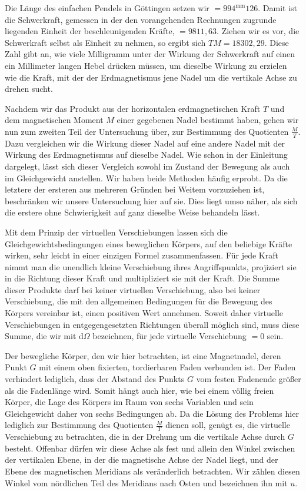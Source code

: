 Die Länge des einfachen Pendels in Göttingen setzen wir $=994^{\mathrm{mm}}126$. Damit ist die Schwerkraft, gemessen in der den vorangehenden Rechnungen zugrunde liegenden Einheit der beschleunigenden Kräfte, $=9811{,}63$. Ziehen wir es vor, die Schwerkraft selbst als Einheit zu nehmen, so ergibt sich $TM=18302{,}29$. Diese Zahl gibt an, wie viele Milligramm unter der Wirkung der Schwerkraft auf einen ein Millimeter langen Hebel drücken müssen, um dieselbe Wirkung zu erzielen wie die Kraft, mit der der Erdmagnetismus jene Nadel um die vertikale Achse zu drehen sucht.

Nachdem wir das Produkt aus der horizontalen erdmagnetischen Kraft $T$ und dem magnetischen Moment $M$ einer gegebenen Nadel bestimmt haben, gehen wir nun zum zweiten Teil der Untersuchung über, zur Bestimmung des Quotienten $\frac MT$. Dazu vergleichen wir die Wirkung dieser Nadel auf eine andere Nadel mit der Wirkung des Erdmagnetismus auf dieselbe Nadel. Wie schon in der Einleitung dargelegt, lässt sich dieser Vergleich sowohl im Zustand der Bewegung als auch im Gleichgewicht anstellen. Wir haben beide Methoden häufig erprobt. Da die letztere der ersteren aus mehreren Gründen bei Weitem vorzuziehen ist, beschränken wir unsere Untersuchung hier auf sie. Dies liegt umso näher, als sich die erstere ohne Schwierigkeit auf ganz dieselbe Weise behandeln lässt.

Mit dem Prinzip der virtuellen Verschiebungen lassen sich die Gleichgewichtsbedingungen eines beweglichen Körpers, auf den beliebige Kräfte wirken, sehr leicht in einer einzigen Formel zusammenfassen. Für jede Kraft nimmt man die unendlich kleine Verschiebung ihres Angriffspunkts, projiziert sie in die Richtung dieser Kraft und multipliziert sie mit der Kraft. Die Summe dieser Produkte darf bei keiner virtuellen Verschiebung, also bei keiner Verschiebung, die mit den allgemeinen Bedingungen für die Bewegung des Körpers vereinbar ist, einen positiven Wert annehmen. Soweit daher virtuelle Verschiebungen in entgegengesetzten Richtungen überall möglich sind, muss diese Summe, die wir mit $\mathrm{d}\Omega$ bezeichnen, für jede virtuelle Verschiebung $=0$ sein.

Der bewegliche Körper, den wir hier betrachten, ist eine Magnetnadel, deren Punkt $G$ mit einem oben fixierten, tordierbaren Faden verbunden ist. Der Faden verhindert lediglich, dass der Abstand des Punkts $G$ vom festen Fadenende größer als die Fadenlänge wird. Somit hängt auch hier, wie bei einem völlig freien Körper, die Lage des Körpers im Raum von sechs Variablen und sein Gleichgewicht daher von sechs Bedingungen ab. Da die Lösung des Problems hier lediglich zur Bestimmung des Quotienten $\frac MT$ dienen soll, genügt es, die virtuelle Verschiebung zu betrachten, die in der Drehung um die vertikale Achse durch $G$ besteht. Offenbar dürfen wir diese Achse als fest und allein den Winkel zwischen der vertikalen Ebene, in der die magnetische Achse der Nadel liegt, und der Ebene des magnetischen Meridians als veränderlich betrachten. Wir zählen diesen Winkel vom nördlichen Teil des Meridians nach Osten und bezeichnen ihn mit $u$.

